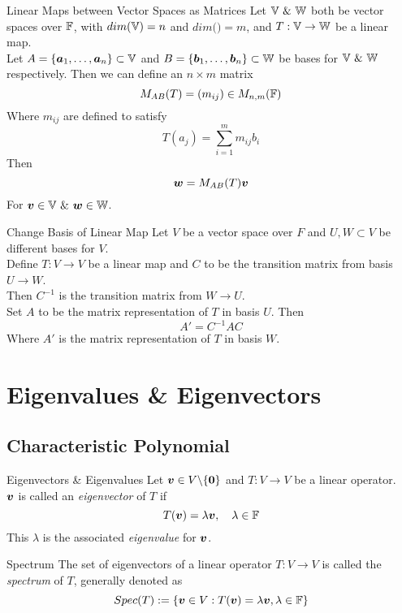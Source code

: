 \documentclass[11pt,a4paper]{article}
\begin{document}
\subtitle{Theorem 7.30 - }{Linear Maps between Vector Spaces as Matrices}
Let $\mathbb{V}\ \&\ \mathbb{W}$ both be vector spaces over $\mathbb{F}$, with $dim(\mathbb{V}) = n$ and $dim(\mathbb) = m$, and $T : \mathbb{V} \to \mathbb{W}$ be a linear map.\\
Let $A = \{\boldsymbol{a}_1, \dots , \boldsymbol{a}_n\} \subset \mathbb{V}$ and $B = \{\boldsymbol{b}_1, \dots , \boldsymbol{b}_n\} \subset \mathbb{W}$ be bases for $\mathbb{V}\ \&\ \mathbb{W}$ respectively.
Then we can define an $n \times m$ matrix $$M_{AB}(T) = (m_{ij}) \in M_{n,m}(\mathbb{F})$$
Where $m_{ij}$ are defined to satisfy
$$T(a_j) = \sum_{i=1}^{m} m_{ij}b_i$$
Then
$$\boldsymbol{w} = M_{AB}(T)\boldsymbol{v}$$
For $\vect{v} \in \vectorspace\ \&\ \vect{w} \in \mathbb{W}$.\\

\subtitle{Theorem 7.31 - }{Change Basis of Linear Map}
Let $V$ be a vector space over $F$ and $U, W \subset V$ be different bases for $V$.\\
Define $T : V \to V$ be a linear map and $C$ to be the transition matrix from basis $U \to W$.\\
Then $C^{-1}$ is the transition matrix from $W \to U$.\\
Set $A$ to be the matrix representation of $T$ in basis $U$. Then
$$A' = C^{-1}AC$$
Where $A'$ is the matrix representation of $T$ in basis $W$.

\section{Eigenvalues \& Eigenvectors}

\subsection{Characteristic Polynomial}

\subtitle{Definition 8.01 - }{Eigenvectors \& Eigenvalues}
Let $\boldsymbol{v} \in V\backslash\{\boldsymbol{0}\}$ and $T : V \to V$ be a linear operator.\\
$\boldsymbol{v}$ is called an \textit{eigenvector} of $T$ if $$T(\boldsymbol{v}) = \lambda\boldsymbol{v}, \quad \lambda \in \mathbb{F}$$
This $\lambda$ is the associated \textit{eigenvalue} for $\boldsymbol{v}$.\\

\subtitle{Definition 8.02 - }{Spectrum}
The set of eigenvectors of a linear operator $T : V \to V$ is called the \textit{spectrum} of $T$, generally denoted as $$Spec(T) := \{\boldsymbol{v} \in V : T(\boldsymbol{v}) = \lambda\boldsymbol{v}, \lambda \in \mathbb{F}\}$$
\end{document}

